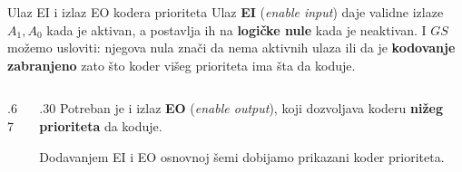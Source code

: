 \begin{frame}[t,label=03-s020]{Ulaz EI i izlaz EO kodera prioriteta}
\setlength{\parskip}{0pt}
\fontsize{11}{13}\selectfont
Ulaz \textcolor{DEisticanje}{\textbf{EI}} (\emph{enable input}) daje validne izlaze \(A_1,A_0\)
kada je aktivan, a postavlja ih na \textbf{logičke nule} kada je neaktivan.
I \(GS\) možemo usloviti: njegova nula znači da nema aktivnih ulaza ili da je
\textbf{kodovanje zabranjeno} zato što koder višeg prioriteta ima šta da koduje.
\par\vspace{.5mm}
\begin{columns}[c,onlytextwidth]
\begin{column}{.67\textwidth}\centering

\end{column}
\begin{column}{.30\textwidth}
Potreban je i izlaz \textcolor{DEisticanje}{\textbf{EO}} (\emph{enable output}),
koji dozvoljava koderu \textbf{nižeg prioriteta} da koduje.
\par\vspace{2mm}
Dodavanjem EI i EO osnovnoj šemi dobijamo prikazani koder prioriteta.
\end{column}
\end{columns}
\end{frame}
